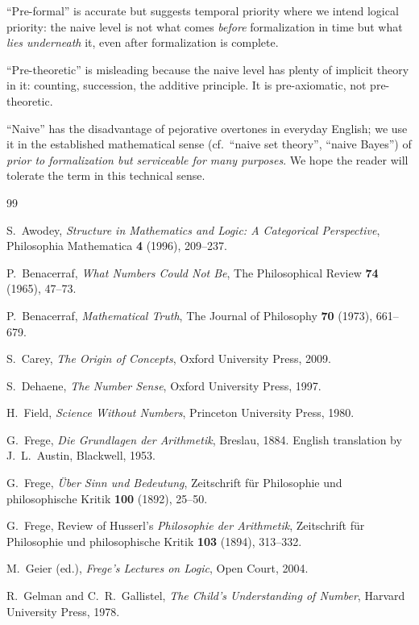 \documentclass[12pt]{article}
\theoremstyle{definition}
\theoremstyle{remark}
\begin{document}
``Pre-formal'' is accurate but suggests temporal priority where we
intend logical priority: the naive level is not what comes \emph{before}
formalization in time but what \emph{lies underneath} it, even after
formalization is complete.

``Pre-theoretic'' is misleading because the naive level has plenty of
implicit theory in it: counting, succession, the additive principle. It
is pre-axiomatic, not pre-theoretic.

``Naive'' has the disadvantage of pejorative overtones in everyday
English; we use it in the established mathematical sense (cf.\ ``naive
set theory'', ``naive Bayes'') of \emph{prior to formalization but
serviceable for many purposes}. We hope the reader will tolerate the
term in this technical sense.

\begin{thebibliography}{99}

S.~Awodey,
\emph{Structure in Mathematics and Logic: A Categorical Perspective},
Philosophia Mathematica \textbf{4} (1996), 209--237.

P.~Benacerraf,
\emph{What Numbers Could Not Be},
The Philosophical Review \textbf{74} (1965), 47--73.

P.~Benacerraf,
\emph{Mathematical Truth},
The Journal of Philosophy \textbf{70} (1973), 661--679.

S.~Carey,
\emph{The Origin of Concepts},
Oxford University Press, 2009.

S.~Dehaene,
\emph{The Number Sense}, Oxford University Press, 1997.

H.~Field,
\emph{Science Without Numbers}, Princeton University Press, 1980.

G.~Frege,
\emph{Die Grundlagen der Arithmetik}, Breslau, 1884.
English translation by J.~L.~Austin, Blackwell, 1953.

G.~Frege,
\emph{\"Uber Sinn und Bedeutung},
Zeitschrift f\"ur Philosophie und philosophische Kritik \textbf{100}
(1892), 25--50.

G.~Frege,
Review of Husserl's \emph{Philosophie der Arithmetik},
Zeitschrift f\"ur Philosophie und philosophische Kritik \textbf{103}
(1894), 313--332.

M.~Geier (ed.),
\emph{Frege's Lectures on Logic}, Open Court, 2004.

R.~Gelman and C.~R.~Gallistel,
\emph{The Child's Understanding of Number},
Harvard University Press, 1978.


\end{thebibliography}
\end{document}
